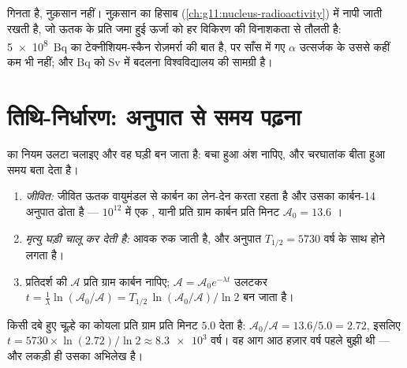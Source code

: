 \begin{remark}[बेक्रेल हानि नहीं हैं]\label{rem:g12:radioactive-decay:dose}
  गिनता है, नुक़सान नहीं। नुक़सान का हिसाब
 (\cref{ch:g11:nucleus-radioactivity}) में नापी जाती  रखती है, जो ऊतक के
प्रति  जमा हुई ऊर्जा को हर विकिरण की विनाशकता से
तौलती है: \qty{5e8}{Bq} का टेक्नीशियम-स्कैन रोज़मर्रा की बात है, पर साँस में गए
$\alpha$ उत्सर्जक के उससे कहीं कम  भी नहीं;
और \unit{Bq} को \unit{Sv} में बदलना विश्वविद्यालय की सामग्री है।
\end{remark}

\section{तिथि-निर्धारण: अनुपात से समय पढ़ना}

 का नियम उलटा चलाइए और वह घड़ी बन जाता है: बचा हुआ अंश नापिए, और चरघातांक
बीता हुआ समय बता देता है।

\begin{method}[रेडियो-कार्बन तिथि-निर्धारण]\label{met:g12:radioactive-decay:carbon}
\begin{enumerate}
  \item \emph{जीवित:} जीवित ऊतक वायुमंडल से कार्बन का लेन-देन करता रहता है
        और उसका कार्बन-14 अनुपात ढोता है --- $10^{12}$ में एक ,
        यानी प्रति ग्राम कार्बन प्रति मिनट $\mathcal A_0 = 13.6$ ।
  \item \emph{मृत्यु घड़ी चालू कर देती है:} आवक रुक जाती है, और अनुपात $T_{1/2} = \num{5730}$
        वर्ष के साथ  होने लगता है।
  \item प्रतिदर्श की  $\mathcal A$ प्रति ग्राम कार्बन नापिए;
        $\mathcal A = \mathcal A_0 e^{-\lambda t}$ उलटकर $t = \frac{1}{\lambda}\ln(\mathcal A_0/\mathcal A)
        = T_{1/2}\,\ln(\mathcal A_0/\mathcal A)/\ln 2$ बन जाता है।
\end{enumerate}
\end{method}

\begin{example}[गुफ़ा में एक चूल्हा]\label{ex:g12:radioactive-decay:hearth}
किसी दबे हुए चूल्हे का कोयला प्रति ग्राम प्रति मिनट $5.0$  देता है:
$\mathcal A_0/\mathcal A = 13.6/5.0 = 2.72$, इसलिए $t = \num{5730} \times \ln(2.72)/\ln 2 \approx \num{8.3e3}$ वर्ष। वह आग आठ हज़ार वर्ष पहले बुझी थी --- और लकड़ी ही
उसका अभिलेख है।
\end{example}

